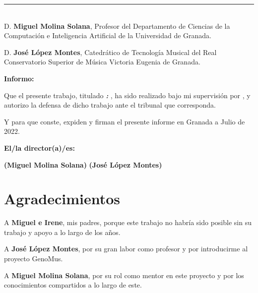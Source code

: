 \cleardoublepage

\thispagestyle{empty}

\noindent\rule[-1ex]{\textwidth}{2pt}\\[4.5ex]

D. \textbf{Miguel Molina Solana}, Profesor del Departamento de Ciencias de la Computación e Inteligencia Artificial de la Universidad de Granada.

D. \textbf{José López Montes}, Catedrático de Tecnología Musical del Real Conservatorio Superior de Música Victoria Eugenia de Granada.

\vspace{0.5cm}

\textbf{Informo:}

\vspace{0.5cm}

Que el presente trabajo, titulado \textit{\textbf{\titulo: \subtitulo}},
ha sido realizado bajo mi supervisión por \textbf{\autor}, y autorizo la defensa de dicho trabajo ante el tribunal que corresponda.

\vspace{0.5cm}

Y para que conste, expiden y firman el presente informe en Granada a Julio de 2022.

\vspace{1cm}

\textbf{El/la director(a)/es: }

\vspace{5cm}

\noindent \textbf{(Miguel Molina Solana)} \hspace{5cm} \textbf{(José López Montes)}

\chapter*{Agradecimientos}

\begin{flushright}
    A \textbf{Miguel e Irene}, mis padres, porque este trabajo no habría sido posible sin su trabajo y apoyo a lo largo de los años.
\end{flushright}

\begin{flushright}
    A \textbf{José López Montes}, por su gran labor como profesor y por introducirme al proyecto GenoMus.
\end{flushright}

\begin{flushright}
    A \textbf{Miguel Molina Solana}, por su rol como mentor en este proyecto y por los conocimientos compartidos a lo largo de este.
\end{flushright}

